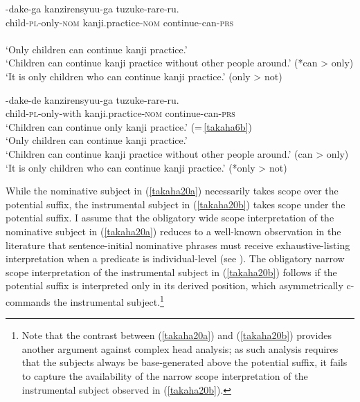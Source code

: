 \documentclass[output=paper]{langscibook}
\begin{document}
\begin{exe}
\ex \label{takaha20}
\begin{xlist}
\ex \label{takaha20a}
	-{dake-ga} {kanzirensyuu-ga} {tuzuke-rare-ru.}\\
	child-\textsc{pl}-only-\textsc{nom}  kanji.practice-\textsc{nom} continue-can-\textsc{prs}\\\\
	\glt `Only children can continue kanji practice.’\\ 
	`Children can continue kanji practice without other people around.’ (*can \textgreater{} only)\\
	‘It is only children who can continue kanji practice.’ (only \textgreater{} not)
	
\ex \label{takaha20b}
	-{dake-de} {kanzirensyuu-ga} {tuzuke-rare-ru.}\\
	child-\textsc{pl}-only-with       kanji.practice-\textsc{nom} continue-can-\textsc{prs}\\
	\glt ‘Children can continue only kanji practice.’ (=\,\ref{takaha6b}) \\
	`Only children can continue kanji practice.’\\ 
	`Children can continue kanji practice without other people around.’ (can \textgreater{} only)\\
	‘It is only children who can continue kanji practice.’ (*only \textgreater{} not)
\end{xlist}
\end{exe}

While the nominative subject in (\ref{takaha20a}) necessarily takes scope over the potential suffix, the instrumental subject in (\ref{takaha20b}) takes scope under the potential suffix. I assume that the obligatory wide scope interpretation of the nominative subject in (\ref{takaha20a}) reduces to a well-known observation in the literature that sentence-initial nominative phrases must receive exhaustive-listing interpretation when a predicate is individual-level (see \citealt{kuno1973}). The obligatory narrow scope interpretation of the instrumental subject in (\ref{takaha20b}) follows if the potential suffix is interpreted only in its derived position, which asymmetrically c-commands the instrumental subject.\footnote{Note that the contrast between (\ref{takaha20a}) and (\ref{takaha20b}) provides another argument against complex head analysis; as such analysis requires that the subjects always be base-generated above the potential suffix, it fails to capture the availability of the narrow scope interpretation of the instrumental subject observed in (\ref{takaha20b}).}
\end{document}
